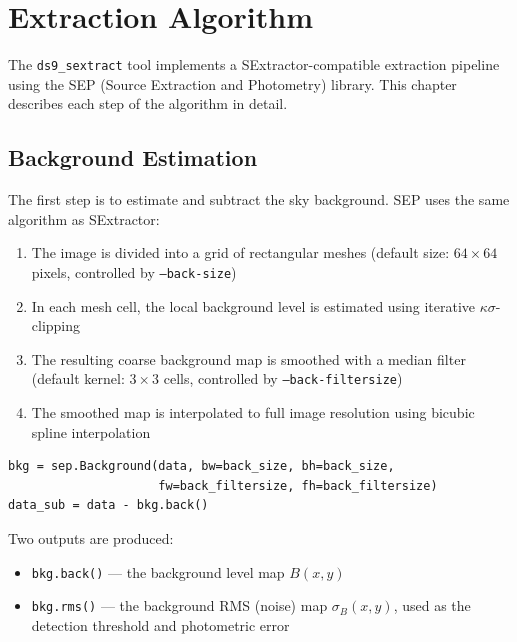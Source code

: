 \documentclass[11pt,fleqn]{book}
\newcommand{\sextract}{\texttt{ds9\_sextract}}
\begin{document}
\chapter{Extraction Algorithm}
\label{ch:algorithm}

The \sextract{} tool implements a SExtractor-compatible extraction pipeline using the SEP (Source Extraction and Photometry) library. This chapter describes each step of the algorithm in detail.

\section{Background Estimation}

The first step is to estimate and subtract the sky background. SEP uses the same algorithm as SExtractor:

\begin{enumerate}[leftmargin=2em]
  \item The image is divided into a grid of rectangular meshes (default size: $64 \times 64$ pixels, controlled by \texttt{--back-size})
  \item In each mesh cell, the local background level is estimated using iterative $\kappa\sigma$-clipping
  \item The resulting coarse background map is smoothed with a median filter (default kernel: $3 \times 3$ cells, controlled by \texttt{--back-filtersize})
  \item The smoothed map is interpolated to full image resolution using bicubic spline interpolation
\end{enumerate}

\begin{codebox}
\begin{lstlisting}[style=python,numbers=none]
bkg = sep.Background(data, bw=back_size, bh=back_size,
                     fw=back_filtersize, fh=back_filtersize)
data_sub = data - bkg.back()
\end{lstlisting}
\end{codebox}

Two outputs are produced:
\begin{itemize}[leftmargin=2em]
  \item \texttt{bkg.back()} --- the background level map $B(x,y)$
  \item \texttt{bkg.rms()} --- the background RMS (noise) map $\sigma_B(x,y)$, used as the detection threshold and photometric error
\end{itemize}
\end{document}
